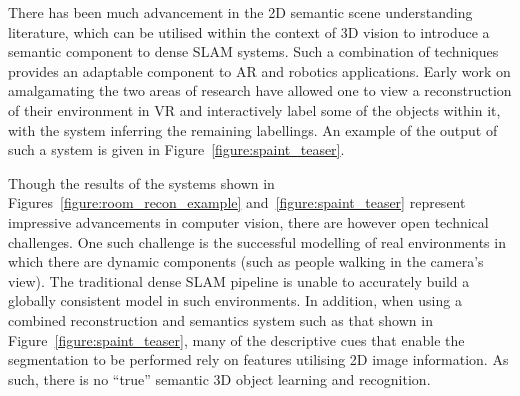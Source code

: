 There has been much advancement in the 2D semantic scene understanding literature, which can be utilised within 
the context of 3D vision to introduce a semantic component to dense SLAM systems. Such a combination of techniques 
provides an adaptable component to AR and robotics applications. Early work on amalgamating the two areas of research 
have allowed one to view a reconstruction of their environment in VR and interactively label some of the objects within 
it, with the system inferring the remaining labellings. An example of the output of such a system is given 
in Figure~\ref{figure:spaint_teaser}.

Though the results of the systems shown in Figures~\ref{figure:room_recon_example} and~\ref{figure:spaint_teaser} 
represent impressive advancements in computer vision, there are however open technical challenges. One such 
challenge is the successful modelling of real environments in which there are dynamic components (such as 
people walking in the camera's view). The traditional dense SLAM pipeline is unable to accurately build a 
globally consistent model in such environments. In addition, when using a combined reconstruction and 
semantics system such as that shown in Figure~\ref{figure:spaint_teaser}, many of the descriptive cues that 
enable the segmentation to be performed rely on features utilising 2D image information. As such, there is 
no ``true'' semantic 3D object learning and recognition.

